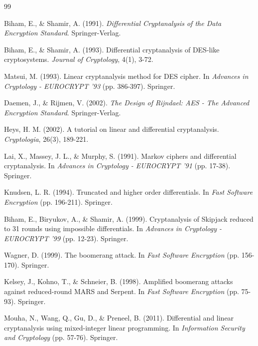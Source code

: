\documentclass[12pt,a4paper]{article}
\theoremstyle{definition}
\begin{document}
\begin{thebibliography}{99}

Biham, E., \& Shamir, A. (1991).
\newblock \textit{Differential Cryptanalysis of the Data Encryption Standard}.
\newblock Springer-Verlag.

Biham, E., \& Shamir, A. (1993).
\newblock Differential cryptanalysis of DES-like cryptosystems.
\newblock \textit{Journal of Cryptology}, 4(1), 3-72.

Matsui, M. (1993).
\newblock Linear cryptanalysis method for DES cipher.
\newblock In \textit{Advances in Cryptology - EUROCRYPT '93} (pp. 386-397). Springer.

Daemen, J., \& Rijmen, V. (2002).
\newblock \textit{The Design of Rijndael: AES - The Advanced Encryption Standard}.
\newblock Springer-Verlag.

Heys, H. M. (2002).
\newblock A tutorial on linear and differential cryptanalysis.
\newblock \textit{Cryptologia}, 26(3), 189-221.

Lai, X., Massey, J. L., \& Murphy, S. (1991).
\newblock Markov ciphers and differential cryptanalysis.
\newblock In \textit{Advances in Cryptology - EUROCRYPT '91} (pp. 17-38). Springer.

Knudsen, L. R. (1994).
\newblock Truncated and higher order differentials.
\newblock In \textit{Fast Software Encryption} (pp. 196-211). Springer.

Biham, E., Biryukov, A., \& Shamir, A. (1999).
\newblock Cryptanalysis of Skipjack reduced to 31 rounds using impossible differentials.
\newblock In \textit{Advances in Cryptology - EUROCRYPT '99} (pp. 12-23). Springer.

Wagner, D. (1999).
\newblock The boomerang attack.
\newblock In \textit{Fast Software Encryption} (pp. 156-170). Springer.

Kelsey, J., Kohno, T., \& Schneier, B. (1998).
\newblock Amplified boomerang attacks against reduced-round MARS and Serpent.
\newblock In \textit{Fast Software Encryption} (pp. 75-93). Springer.

Mouha, N., Wang, Q., Gu, D., \& Preneel, B. (2011).
\newblock Differential and linear cryptanalysis using mixed-integer linear programming.
\newblock In \textit{Information Security and Cryptology} (pp. 57-76). Springer.


\end{thebibliography}
\end{document}
